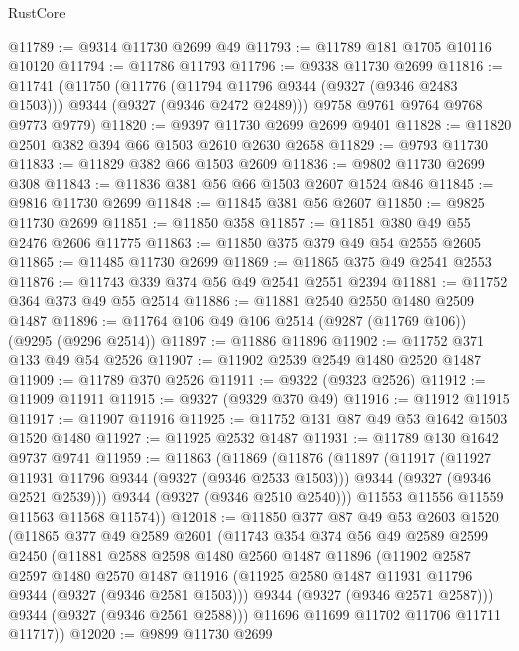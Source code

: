 \begin{lexlean}{RustCore}
\begin{coremodule}
@11789 := @9314 @11730 @2699 @49
@11793 := @11789 @181 @1705 @10116 @10120
@11794 := @11786 @11793
@11796 := @9338 @11730 @2699
@11816 := @11741
    (@11750
      (@11776 (@11794 @11796 @9344 (@9327 (@9346 @2483 @1503))) @9344 (@9327 (@9346 @2472 @2489)))
      @9758
      @9761
      @9764
      @9768
      @9773
      @9779)
@11820 := @9397 @11730 @2699 @2699 @9401
@11828 := @11820 @2501 @382 @394 @66 @1503 @2610 @2630 @2658
@11829 := @9793 @11730
@11833 := @11829 @382 @66 @1503 @2609
@11836 := @9802 @11730 @2699 @308
@11843 := @11836 @381 @56 @66 @1503 @2607 @1524 @846
@11845 := @9816 @11730 @2699
@11848 := @11845 @381 @56 @2607
@11850 := @9825 @11730 @2699
@11851 := @11850 @358
@11857 := @11851 @380 @49 @55 @2476 @2606 @11775
@11863 := @11850 @375 @379 @49 @54 @2555 @2605
@11865 := @11485 @11730 @2699
@11869 := @11865 @375 @49 @2541 @2553
@11876 := @11743 @339 @374 @56 @49 @2541 @2551 @2394
@11881 := @11752 @364 @373 @49 @55 @2514
@11886 := @11881 @2540 @2550 @1480 @2509 @1487
@11896 := @11764 @106 @49 @106 @2514 (@9287 (@11769 @106)) (@9295 (@9296 @2514))
@11897 := @11886 @11896
@11902 := @11752 @371 @133 @49 @54 @2526
@11907 := @11902 @2539 @2549 @1480 @2520 @1487
@11909 := @11789 @370 @2526
@11911 := @9322 (@9323 @2526)
@11912 := @11909 @11911
@11915 := @9327 (@9329 @370 @49)
@11916 := @11912 @11915
@11917 := @11907 @11916
@11925 := @11752 @131 @87 @49 @53 @1642 @1503 @1520 @1480
@11927 := @11925 @2532 @1487
@11931 := @11789 @130 @1642 @9737 @9741
@11959 := @11863
    (@11869
      (@11876
        (@11897
          (@11917
            (@11927 @11931 @11796 @9344 (@9327 (@9346 @2533 @1503)))
            @9344
            (@9327 (@9346 @2521 @2539)))
          @9344
          (@9327 (@9346 @2510 @2540)))
        @11553
        @11556
        @11559
        @11563
        @11568
        @11574))
@12018 := @11850
    @377
    @87
    @49
    @53
    @2603
    @1520
    (@11865
      @377
      @49
      @2589
      @2601
      (@11743
        @354
        @374
        @56
        @49
        @2589
        @2599
        @2450
        (@11881
          @2588
          @2598
          @1480
          @2560
          @1487
          @11896
          (@11902
            @2587
            @2597
            @1480
            @2570
            @1487
            @11916
            (@11925 @2580 @1487 @11931 @11796 @9344 (@9327 (@9346 @2581 @1503)))
            @9344
            (@9327 (@9346 @2571 @2587)))
          @9344
          (@9327 (@9346 @2561 @2588)))
        @11696
        @11699
        @11702
        @11706
        @11711
        @11717))
@12020 := @9899 @11730 @2699

\end{coremodule}
\end{lexlean}
